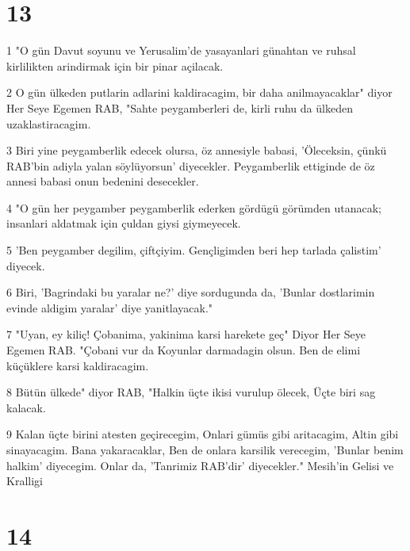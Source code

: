 \chapter{13}

\par 1 "O gün Davut soyunu ve Yerusalim'de yasayanlari günahtan ve ruhsal kirlilikten arindirmak için bir pinar açilacak.
\par 2 O gün ülkeden putlarin adlarini kaldiracagim, bir daha anilmayacaklar" diyor Her Seye Egemen RAB, "Sahte peygamberleri de, kirli ruhu da ülkeden uzaklastiracagim.
\par 3 Biri yine peygamberlik edecek olursa, öz annesiyle babasi, 'Öleceksin, çünkü RAB'bin adiyla yalan söylüyorsun' diyecekler. Peygamberlik ettiginde de öz annesi babasi onun bedenini desecekler.
\par 4 "O gün her peygamber peygamberlik ederken gördügü görümden utanacak; insanlari aldatmak için çuldan giysi giymeyecek.
\par 5 'Ben peygamber degilim, çiftçiyim. Gençligimden beri hep tarlada çalistim' diyecek.
\par 6 Biri, 'Bagrindaki bu yaralar ne?' diye sordugunda da, 'Bunlar dostlarimin evinde aldigim yaralar' diye yanitlayacak."
\par 7 "Uyan, ey kiliç! Çobanima, yakinima karsi harekete geç" Diyor Her Seye Egemen RAB. "Çobani vur da Koyunlar darmadagin olsun. Ben de elimi küçüklere karsi kaldiracagim.
\par 8 Bütün ülkede" diyor RAB, "Halkin üçte ikisi vurulup ölecek, Üçte biri sag kalacak.
\par 9 Kalan üçte birini atesten geçirecegim, Onlari gümüs gibi aritacagim, Altin gibi sinayacagim. Bana yakaracaklar, Ben de onlara karsilik verecegim, 'Bunlar benim halkim' diyecegim. Onlar da, 'Tanrimiz RAB'dir' diyecekler." Mesih'in Gelisi ve Kralligi

\chapter{14}

